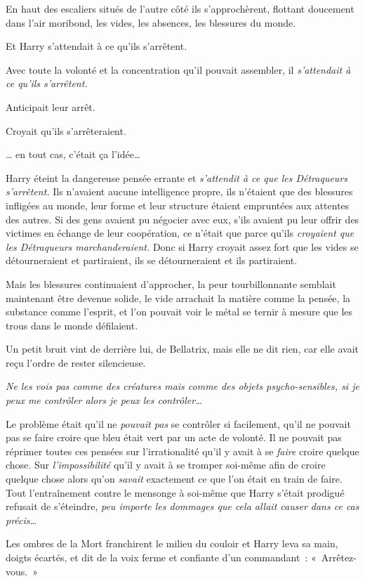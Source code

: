 En haut des escaliers situés de l'autre côté ils s'approchèrent, flottant doucement dans l'air moribond, les vides, les absences, les blessures du monde.

Et Harry s'attendait à ce qu'ils s'arrêtent.

Avec toute la volonté et la concentration qu'il pouvait assembler, il \emph{s'attendait à ce qu'ils s'arrêtent.}

Anticipait leur arrêt.

Croyait qu'ils s'arrêteraient.

… en tout cas, c'était ça l'idée…

Harry éteint la dangereuse pensée errante et \emph{s'attendit à ce que les Détraqueurs s'arrêtent.} Ils n'avaient aucune intelligence propre, ils n'étaient que des blessures infligées au monde, leur forme et leur structure étaient empruntées aux attentes des autres.
Si des gens avaient pu négocier avec eux, s'ils avaient pu leur offrir des victimes en échange de leur coopération, ce n'était que parce qu'ils \emph{croyaient que les Détraqueurs marchanderaient.} Donc si Harry croyait assez fort que les vides se détourneraient et partiraient, ils se détourneraient et ils partiraient.

Mais les blessures continuaient d'approcher, la peur tourbillonnante semblait maintenant être devenue solide, le vide arrachait la matière comme la pensée, la substance comme l'esprit, et l'on pouvait voir le métal se ternir à mesure que les trous dans le monde défilaient.

Un petit bruit vint de derrière lui, de Bellatrix, mais elle ne dit rien, car elle avait reçu l'ordre de rester silencieuse.

\emph{Ne les vois pas comme des créatures mais comme des objets psycho-sensibles, si je peux me contrôler alors je peux les contrôler…}

Le problème était qu'il ne \emph{pouvait pas} se contrôler si facilement, qu'il ne pouvait pas se faire croire que bleu était vert par un acte de volonté.
Il ne pouvait pas réprimer toutes ces pensées sur l'irrationalité qu'il y avait à se \emph{faire} croire quelque chose.
Sur \emph{l'impossibilité} qu'il y avait à se tromper soi-même afin de croire quelque chose alors qu'on \emph{savait} exactement ce que l'on était en train de faire.
Tout l'entraînement contre le mensonge à soi-même que Harry s'était prodigué refusait de s'éteindre, \emph{peu importe les dommages que cela allait causer dans ce cas précis…}

Les ombres de la Mort franchirent le milieu du couloir et Harry leva sa main, doigts écartés, et dit de la voix ferme et confiante d'un commandant~: «~Arrêtez-vous.~»

